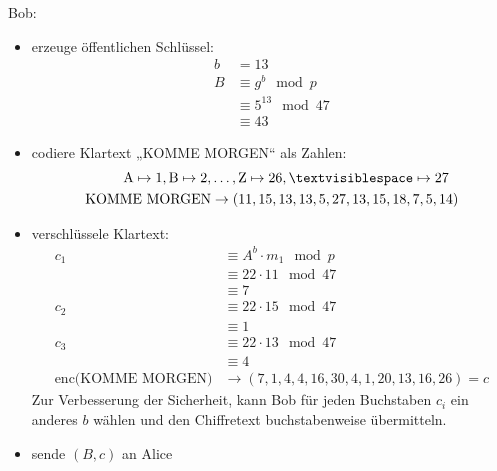 \documentclass[
  a4paper,
  11pt,
]{article}
\begin{document}
\begin{itemize}
    Bob:
    \begin{itemize}
      \item erzeuge öffentlichen Schlüssel:
        \begin{align*}
          b & = 13\\
          B & \equiv g^b \mod p\\
            & \equiv 5^{13} \mod 47\\
            & \equiv 43
        \end{align*}
      \item codiere Klartext „KOMME MORGEN“ als Zahlen:
        \begin{align*}
          \text{A} \mapsto 1, \text{B} \mapsto 2, & \ldots, \text{Z} \mapsto 26,
          \textvisiblespace \mapsto 27\\
          \text{KOMME MORGEN} & \to (11, 15, 13, 13, 5, 27, 13, 15, 18, 7, 5, 14)
        \end{align*}
      \item verschlüssele Klartext:
        \begin{align*}
          c_1 & \equiv A^b \cdot m_1 \mod p\\
              & \equiv 22 \cdot 11 \mod 47\\
              & \equiv 7\\
          c_2 & \equiv 22 \cdot 15 \mod 47\\
              & \equiv 1\\
          c_3 & \equiv 22 \cdot 13 \mod 47\\
              & \equiv 4\\
          \text{enc(KOMME MORGEN)} & \to (7, 1, 4, 4, 16, 30, 4, 1, 20, 13, 16,
          26) = c
        \end{align*}
        Zur Verbesserung der Sicherheit, kann Bob für jeden Buchstaben $c_i$ ein
        anderes $b$ wählen und den Chiffretext buchstabenweise übermitteln.
      \item sende $(B, c)$ an Alice
    \end{itemize}


\end{itemize}
\end{document}
